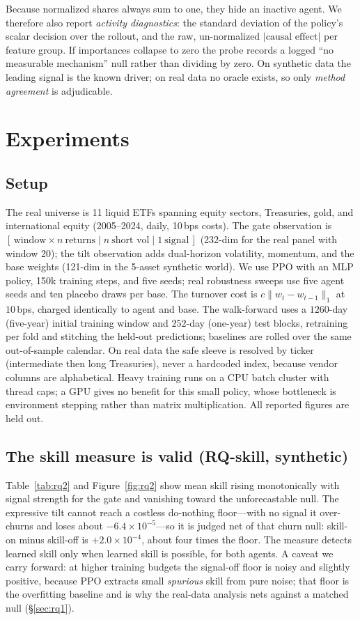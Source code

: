 \documentclass[sigconf,anonymous,review]{acmart}
\begin{document}
Because normalized shares always sum to one, they hide an inactive agent. We
therefore also report \emph{activity diagnostics}: the standard deviation of the
policy's scalar decision over the rollout, and the raw, un-normalized
$\lvert\text{causal effect}\rvert$ per feature group. If importances collapse to
zero the probe records a logged ``no measurable mechanism'' null rather than dividing
by zero. On synthetic data the leading signal is the known driver; on real data no
oracle exists, so only \emph{method agreement} is adjudicable.

\section{Experiments}

\subsection{Setup}
The real universe is 11 liquid ETFs spanning equity sectors, Treasuries, gold, and
international equity (2005--2024, daily, 10\,bps costs). The gate observation is
$[\,\text{window}\times n\ \text{returns}\mid n\ \text{short vol}\mid 1\
\text{signal}\,]$ (232-dim for the real panel with window 20); the tilt observation
adds dual-horizon volatility, momentum, and the base weights (121-dim in the 5-asset
synthetic world). We use PPO with an MLP policy, 150k training steps, and five seeds;
real robustness sweeps use five agent seeds and ten placebo draws per base. The
turnover cost is $c\|w_t-w_{t-1}\|_1$ at $10$\,bps, charged identically to agent and
base. The walk-forward uses a $1260$-day (five-year) initial training window and
$252$-day (one-year) test blocks, retraining per fold and stitching the held-out
predictions; baselines are rolled over the same out-of-sample calendar. On real data
the safe sleeve is resolved by ticker (intermediate then long Treasuries), never a
hardcoded index, because vendor columns are alphabetical. Heavy training runs on a CPU
batch cluster with thread caps; a GPU gives no benefit for this small policy, whose
bottleneck is environment stepping rather than matrix multiplication. All reported
figures are held out.

\subsection{The skill measure is valid (RQ-skill, synthetic)}
Table~\ref{tab:rq2} and Figure~\ref{fig:rq2} show mean skill rising monotonically with
signal strength for the gate and vanishing toward the unforecastable null. The expressive tilt cannot
reach a costless do-nothing floor---with no signal it over-churns and loses about
$-6.4\times10^{-5}$---so it is judged net of that churn null: skill-on minus
skill-off is $+2.0\times10^{-4}$, about four times the floor. The measure detects
learned skill only when learned skill is possible, for both agents. A caveat we
carry forward: at higher training budgets the signal-off floor is noisy and slightly
positive, because PPO extracts small \emph{spurious} skill from pure noise; that
floor is the overfitting baseline and is why the real-data analysis nets against a
matched null (\S\ref{sec:rq1}).
\end{document}
